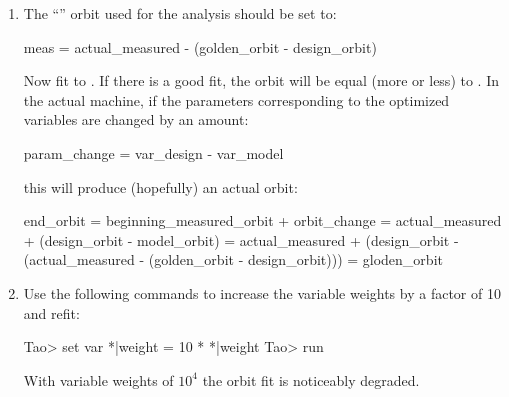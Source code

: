 \documentclass{hitec}     %
\begin{document}
\begin{enumerate}[label=\ref*{s:opt.cor}.\arabic{enumi}]
\item
The ``'' orbit used for the analysis should be set to:
\begin{code}
meas = actual_measured - (golden_orbit - design_orbit)
\end{code}
Now fit to . If there is a good fit, the  orbit will be equal (more or
less) to . In the actual machine, if the parameters corresponding to the optimized
variables are changed by an amount:
\begin{code}
param_change = var_design - var_model
\end{code}
this will produce (hopefully) an actual orbit:
\begin{code}
end_orbit = beginning_measured_orbit + orbit_change
          = actual_measured + (design_orbit - model_orbit)
          = actual_measured + (design_orbit - 
                     (actual_measured - (golden_orbit - design_orbit)))
          = gloden_orbit
\end{code}
%
\item
Use the following commands to increase the variable weights by a factor of 10 and refit:
\begin{code}
Tao> set var *|weight = 10 * *|weight
Tao> run
\end{code}
With variable weights of $10^4$ the orbit fit is noticeably degraded.
\end{enumerate}

%

%
\end{document}
